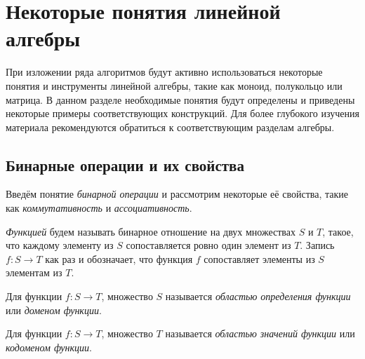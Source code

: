 \setchapterpreamble[u]{\margintoc}
\chapter{Некоторые понятия линейной алгебры}
\label{chpt:LinAlIntro}

При изложении ряда алгоритмов будут активно использоваться некоторые понятия и инструменты линейной алгебры, такие как моноид, полукольцо или матрица.
В данном разделе необходимые понятия будут определены и приведены некоторые примеры соответствующих конструкций.
Для более глубокого изучения материала рекомендуются обратиться к соответствующим разделам алгебры.

\section{Бинарные операции и их свойства}

Введём понятие \emph{бинарной операции} и рассмотрим некоторые её свойства, такие как \emph{коммутативность} и \emph{ассоциативность}.

\begin{definition}[Функция]
    \emph{Функцией} будем называть бинарное отношение на двух множествах $S$ и $T$, такое, что каждому элементу из $S$ сопоставляется ровно один элемент из $T$.
    Запись $f: S \to T$ как раз и обозначает, что функция $f$ сопоставляет элементы из $S$ элементам из $T$.
\end{definition}

\begin{definition}
    Для функции $f: S \to T$, множество $S$ называется \emph{областью определения функции} или \emph{доменом функции}.
\end{definition}

\begin{definition}
    Для функции $f: S \to T$, множество $T$ называется \emph{областью значений функции} или \emph{кодоменом функции}.
\end{definition}

